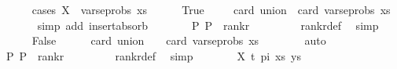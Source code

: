 \begin{isabellebody}
\ \ \ \ \ \isamarkupfalse%
{\isacharparenleft}{\kern0pt}cases\ {\isachardoublequoteopen}X\ {\isasymin}\ vars{\isacharunderscore}{\kern0pt}eprobs\ xs{\isachardoublequoteclose}{\isacharparenright}{\kern0pt}\isanewline
\ \ \ \ \isamarkupfalse%
\ True\isanewline
\ \ \ \isamarkupfalse%
\ {\isachardoublequoteopen}card\ {\isacharquery}{\kern0pt}union\ {\isacharequal}{\kern0pt}\ card\ {\isacharparenleft}{\kern0pt}vars{\isacharunderscore}{\kern0pt}eprobs\ xs{\isacharparenright}{\kern0pt}{\isachardoublequoteclose}\isanewline
\ \ \ \ \ \isamarkupfalse%
\ {\isacharparenleft}{\kern0pt}simp\ add{\isacharcolon}{\kern0pt}\ insert{\isacharunderscore}{\kern0pt}absorb{\isacharparenright}{\kern0pt}\isanewline
\ \ \ \isamarkupfalse%
\ {}\ \isamarkupfalse%
\ {\isachardoublequoteopen}{\isacharparenleft}{\kern0pt}P{}{\isacharcomma}{\kern0pt}\ P{}{\isacharparenright}{\kern0pt}\ {\isasymin}\ rank{\isacharunderscore}{\kern0pt}r{\isachardoublequoteclose}\ \isanewline
\ \ \ \ \ \ \isamarkupfalse%
\ rank{\isacharunderscore}{\kern0pt}r{\isacharunderscore}{\kern0pt}def\ \isamarkupfalse%
\ simp\isanewline
\ \ \isamarkupfalse%
\isanewline
\ \ \ \ \isamarkupfalse%
\ False\isanewline
\ \ \ \ \isamarkupfalse%
\ {\isachardoublequoteopen}card\ {\isacharquery}{\kern0pt}union\ {\isacharequal}{\kern0pt}\ {}\ {\isacharplus}{\kern0pt}\ card\ {\isacharparenleft}{\kern0pt}vars{\isacharunderscore}{\kern0pt}eprobs\ xs{\isacharparenright}{\kern0pt}{\isachardoublequoteclose}\isanewline
\ \ \ \ \ \ \isamarkupfalse%
\ auto\isanewline
\ \ \ \ \isamarkupfalse%
\ {}\ \isamarkupfalse%
\ {\isachardoublequoteopen}{\isacharparenleft}{\kern0pt}P{}{\isacharcomma}{\kern0pt}\ P{}{\isacharparenright}{\kern0pt}\ {\isasymin}\ rank{\isacharunderscore}{\kern0pt}r{\isachardoublequoteclose}\ \isanewline
\ \ \ \ \ \ \isamarkupfalse%
\ rank{\isacharunderscore}{\kern0pt}r{\isacharunderscore}{\kern0pt}def\ \isamarkupfalse%
\ simp\isanewline
\ \ \isamarkupfalse%
\isanewline
{}\isamarkupfalse%
\isanewline
\ \ \isamarkupfalse%
\ {\isacharparenleft}{\kern0pt}{}\ X\ t\ pi\ xs\ ys{\isacharparenright}{\kern0pt}\isanewline
\ \ \ \isamarkupfalse%

\end{isabellebody}
